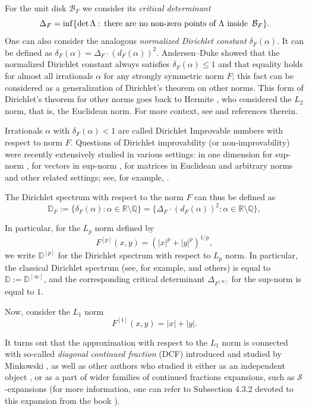 \documentclass[11pt]{amsart}
\newcommand{\R}{\mathbb R}
\newcommand{\Q}{\mathbb Q}
\begin{document}
For the unit disk $\mathcal{B}_F$ we consider its {\it critical determinant}
  $$
  \Delta_F = \inf \{ {\rm det} \,\Lambda: \,\text{there are no non-zero points of $\Lambda$ inside }\, \mathcal{B}_F\}.
  $$
One can also consider the analogous {\it normalized Dirichlet constant}  $\delta_F(\alpha)$. It can be defined as $ \delta_F(\alpha) =\Delta_F  \cdot (   d_F  (\alpha))^2$. Andersen--Duke showed that the normalized Dirichlet constant always satisfies $\delta_F(\alpha)\leq1$ and that equality holds for almost all irrationals $\alpha$ for any strongly symmetric norm $F$; this fact can be considered as a generalization of Dirichlet's theorem on other norms. This form of Dirichlet's theorem for other norms goes back to Hermite \cite{her}, who considered the $L_2$ norm, that is, the Euclidean norm. For more context, see \cite{AD} and references therein. 

Irrationals $\alpha$ with $\delta_F(\alpha)<1$ are called Dirichlet Improvable numbers with respect to norm $F$. Questions of Dirichlet improvability (or non-improvability) were recently extensively studied in various settings: in one dimension for sup-norm \cite{MR3767339, MR3798609}, for vectors in sup-norm \cite{MR4732648}, for matrices in Euclidean and arbitrary norms \cite{MR4410764,KR} and other related settings; see, for example, \cite{MR4500198,MR4587901}.


The Dirichlet spectrum with respect to the norm $F$ can thus be defined as
$$
\mathbb{D}_F:= \{ \delta_{F}(\alpha): \alpha\in\R\setminus\Q\} = \{ \Delta_F\cdot(d_{F}(\alpha))^2: \alpha\in\R\setminus\Q\},
$$


In particular, for the $L_p$ norm defined by 
$$
  F^{[p]}(x,y)=(|x|^{p}+|y|^{p})^{1/p},
$$
we write $\mathbb{D}^{[p]}$ for the Dirichlet spectrum with respect to $L_p$ norm. In particular, the classical Dirichlet spectrum (see, for example, \cite{MR4934021,MR1574660} and others) is equal to 
$
\mathbb{D}:=\mathbb{D}^{[\infty]}
$, and the corresponding critical determinant $\Delta_{F^{[\infty]}}$ for the sup-norm is equal to $1$.

Now, consider the $L_1$ norm
\begin{equation}\label{L1norm}
        F^{[1]}(x,y)=|x|+|y|.
\end{equation}

It turns out that the approximation with respect to the $L_1$ norm is connected with so-called {\it diagonal continued fraction} (DCF) introduced and studied by Minkowski \cite{MR1511108, MR1508923,MR249269}, as well as other authors who studied it either as an independent object \cite{KRAAIKAMP1989197}, or as a part of wider families of continued fractions expansions, such as $\mathcal S$-expansions (for more information, one can refer to Subsection 4.3.2 devoted to this expansion from the book \cite{MR1960327}).
\end{document}
